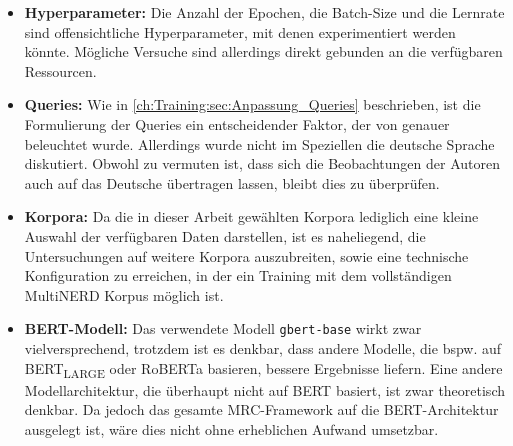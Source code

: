 \begin{itemize}
	\item \textbf{Hyperparameter:} Die Anzahl der Epochen, die Batch-Size und die Lernrate sind offensichtliche Hyperparameter, mit denen experimentiert werden könnte. Mögliche Versuche sind allerdings direkt gebunden an die verfügbaren Ressourcen.
	\item \textbf{Queries:} Wie in \autoref{ch:Training:sec:Anpassung_Queries} beschrieben, ist die Formulierung der Queries ein entscheidender Faktor, der von \cite{li2019unified} genauer beleuchtet wurde. Allerdings wurde nicht im Speziellen die deutsche Sprache diskutiert. Obwohl zu vermuten ist, dass sich die Beobachtungen der Autoren auch auf das Deutsche übertragen lassen, bleibt dies zu überprüfen.
	\item \textbf{Korpora:} Da die in dieser Arbeit gewählten Korpora lediglich eine kleine Auswahl der verfügbaren Daten darstellen, ist es naheliegend, die Untersuchungen auf weitere Korpora auszubreiten, sowie eine technische Konfiguration zu erreichen, in der ein Training mit dem vollständigen MultiNERD Korpus möglich ist.
	\item \textbf{BERT-Modell:} Das verwendete Modell \verb|gbert-base| wirkt zwar vielversprechend, trotzdem ist es denkbar, dass andere Modelle, die bspw. auf BERT\textsubscript{LARGE} oder RoBERTa basieren, bessere Ergebnisse liefern. Eine andere Modellarchitektur, die überhaupt nicht auf BERT basiert, ist zwar theoretisch denkbar. Da jedoch das gesamte MRC\--Frame\-work auf die BERT-Architektur ausgelegt ist, wäre dies nicht ohne erheblichen Aufwand umsetzbar.
\end{itemize}

